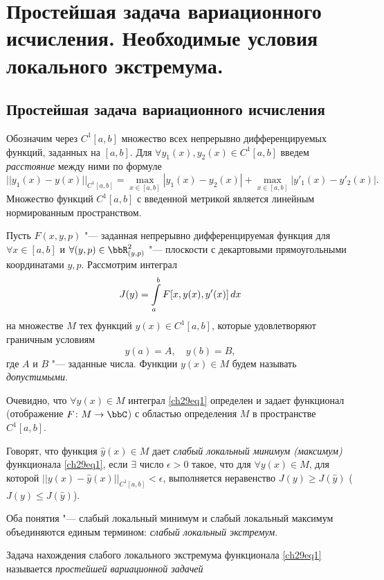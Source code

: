\chapter{Простейшая задача вариационного исчисления. Необходимые условия локального экстремума.}
\section{Простейшая задача вариационного исчисления} 
Обозначим через $C^1[a,b]$ множество всех непрерывно дифференцируемых функций, заданных на $[a,b]$. Для $\forall y_1(x),y_2(x)\in C^1[a,b]$ введем \textit{расстояние} между ними по формуле
$$
||y_1(x)-y(x)||_{C^1[a,b]}=\max_{x\in [a,b]}\limits |y_1(x)-y_2(x)|+\max_{x\in[a,b]}\limits |y'_1(x)-y'_2(x)|. 
$$ 
Множество функций $C^1[a,b]$ с введенной метрикой является линейным нормированным пространством.

Пусть $F(x,y,p)$ "--- заданная непрерывно дифференцируемая функция для $\forall x\in [a,b]$ и $\forall(y,p)\in \bbR^2_{(y,p)}$ "--- плоскости с декартовыми прямоугольными координатами $y,p$. Рассмотрим интеграл
\begin{equation}\label{ch29eq1}
J(y)=\int_a^b\limits F[x,y(x),y'(x)]\,dx
\end{equation}
на множестве $M$ тех функций $y(x)\in C^1[a,b]$, которые удовлетворяют граничным условиям
\begin{equation}\label{ch29eq2}
y(a)=A,\quad y(b)=B,
\end{equation}
где $A$ и $B$ "--- заданные числа. Функции $y(x)\in M$ будем называть \textit{допустимыми}.

Очевидно, что $\forall y(x)\in M$ интеграл \eqref{ch29eq1} определен и задает функционал (отображение $F \colon M \to \bbC$) с областью определения $M$ в пространстве $C^1[a,b]$.

\begin{defn}
Говорят, что функция $\hat{y}(x)\in M$ дает \textit{слабый локальный минимум (максимум)} функционала \eqref{ch29eq1}, если $\exists$ число $\epsilon>0$ такое, что для $\forall y(x)\in M$, для которой $||y(x)-\hat{y}(x)||_{C^1[a,b]}<\epsilon$, выполняется неравенство $J(y)\geq J(\hat{y})$ ($J(y)\le J(\hat{y})$).
\end{defn}

Оба понятия "--- слабый локальный минимум и слабый локальный максимум объединяются единым термином: \textit{слабый локальный экстремум}.

\begin{defn}
Задача нахождения слабого локального экстремума функционала \eqref{ch29eq1} называется \textit{простейшей вариационной задачей}
\end{defn}

